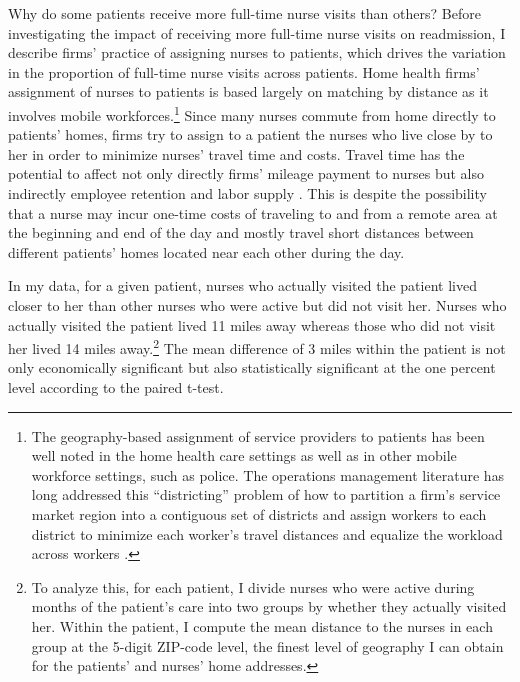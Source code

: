 \documentclass[final,12pt]{article}
\begin{document}
Why do some patients receive more full-time nurse visits than others?
Before investigating the impact of receiving more full-time nurse visits on readmission, I describe firms' practice of assigning nurses to patients, which drives the variation in the proportion of full-time nurse visits across patients.
Home health firms' assignment of nurses to patients is based largely on matching by distance as it involves mobile workforces.\footnote{The geography-based assignment of service providers to patients has been well noted in the home health care settings as well as in other mobile workforce settings, such as police. The operations management literature has long addressed this ``districting'' problem of how to partition a firm's service market region into a contiguous set of districts and assign workers to each district to minimize each worker's travel distances and equalize the workload across workers \citep{Tavares-Pereira2007}.
}
Since many nurses commute from home directly to patients' homes, firms try to assign to a patient the nurses who live close by to her in order to minimize nurses' travel time and costs.
Travel time has the potential to affect not only directly firms' mileage payment to nurses but also indirectly employee retention \citep{Chapple2001} and labor supply \citep{Gutierrez-i-Puigarnau2010, Gimenez-Nadal2011}.
This is despite the possibility that a nurse may incur one-time costs of traveling to and from a remote area at the beginning and end of the day and mostly travel short distances between different patients' homes located near each other during the day.  %

In my data, for a given patient, nurses who actually visited the patient lived closer to her than other nurses who were active but did not visit her.
Nurses who actually visited the patient lived 11 miles away whereas those who did not visit her lived 14 miles away.\footnote{To analyze this, for each patient, I divide nurses who were active during months of the patient's care into two groups by whether they actually visited her.
Within the patient, I compute the mean distance to the nurses in each group at the 5-digit ZIP-code level, the finest level of geography I can obtain for the patients' and nurses' home addresses.}
The mean difference of 3 miles within the patient is not only economically significant but also statistically significant at the one percent level according to the paired t-test.
\end{document}
